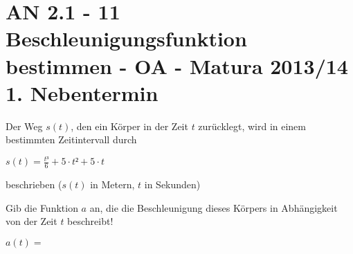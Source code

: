 \section{AN 2.1 - 11 Beschleunigungsfunktion bestimmen - OA - Matura 2013/14 1. Nebentermin}

\begin{beispiel}[AN 2.1]{1} %
				Der Weg $s(t)$, den ein Körper in der Zeit $t$ zurücklegt, wird in einem bestimmten Zeitintervall durch
				\begin{center}$s(t)=\frac{t³}{6}+5\cdot t²+5\cdot t$\end{center}
				beschrieben ($s(t)$ in Metern, $t$ in Sekunden)
				
				Gib die Funktion $a$ an, die die Beschleunigung dieses Körpers in Abhängigkeit von der Zeit $t$ beschreibt!\leer
				
				$a(t)=$ 
\end{beispiel}